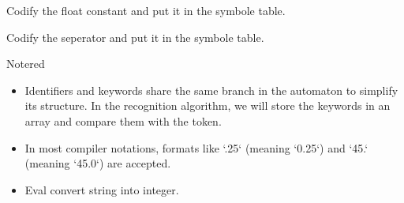\begin{algorithm}
\begin{algorithmic}[1]
\vspace{0.15em}
 
 
\Else
\State Codify the float constant and put it in the symbole table.
\EndIf

\vspace{0.15em}
\Else {}
\State Codify the seperator and put it in the symbole table.
\EndIf
\vspace{0.25em}

\vspace{0.25em}
\EndIf
\fin
\end{algorithmic}
\end{algorithm}

\null
\newpage

\begin{prettyBox}{Note}{red}
\begin{itemize}
    \item Identifiers and keywords share the same branch in the automaton to simplify its structure.  
          In the recognition algorithm, we will store the keywords in an array and compare them with the token.  
    \item In most compiler notations, formats like `.25` (meaning `0.25`) and `45.` (meaning `45.0`) are accepted.  
    \item Eval convert string into integer.
\end{itemize}
\end{prettyBox}


